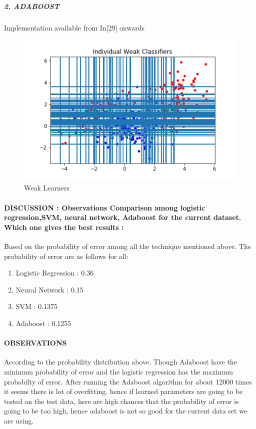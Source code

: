 \documentclass[11pt]{article}
\makeatletter
\def\maxwidth{\ifdim\Gin@nat@width>\linewidth\linewidth
    \else\Gin@nat@width\fi}
\let\Oldincludegraphics\includegraphics
\renewcommand{\includegraphics}[1]{\Oldincludegraphics[width=.8\maxwidth]{#1}}
\providecommand{\tightlist}{%
      \setlength{\itemsep}{0pt}\setlength{\parskip}{0pt}}
\makeatother
\begin{document}
\subparagraph{2. ADABOOST}\label{adaboost}

Implementation available from In{[}29{]} onwards

\begin{figure}
\centering
\includegraphics{weak_1075.png}
\caption{Weak Learners}
\end{figure}

\paragraph{DISCUSSION : Observations Comparison among logistic
regression,SVM, neural network, Adaboost for the current dataset. Which
one gives the best results
:}\label{discussion-observations-comparison-among-logistic-regressionsvm-neural-network-adaboost-for-the-current-dataset.-which-one-gives-the-best-results}

Based on the probability of error among all the technique mentioned
above. The probability of error are as follows for all:

\begin{enumerate}
\def\labelenumi{\arabic{enumi}.}
\tightlist
\item
  Logistic Regression : 0.36
\item
  Neural Network : 0.15
\item
  SVM : 0.1375
\item
  Adaboost : 0.1255
\end{enumerate}

\paragraph{OBSERVATIONS}\label{observations}

According to the probability distribution above. Though Adaboost have
the minimum probability of error and the logistic regression has the
maximum probabilty of error. After running the Adaboost algorithm for
about 12000 times it seems there is lot of overfitting. hence if learned
parameters are going to be tested on the test data, here are high
chances that the probability of error is going to be too high, hence
adaboost is not so good for the current data set we are using.
\end{document}
